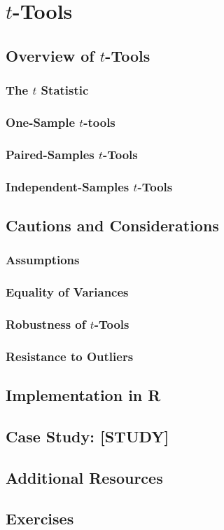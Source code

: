 
\chapter{$t$-Tools}

\section{Overview of $t$-Tools}

\subsection{The $t$ Statistic}

\subsection{One-Sample $t$-tools}

\subsection{Paired-Samples $t$-Tools}

\subsection{Independent-Samples $t$-Tools}

\section{Cautions and Considerations}

\subsection{Assumptions}

\subsection{Equality of Variances}

\subsection{Robustness of $t$-Tools}

\subsection{Resistance to Outliers}

\section{Implementation in R}

\section{Case Study: [STUDY]}

\section{Additional Resources}

\section{Exercises}